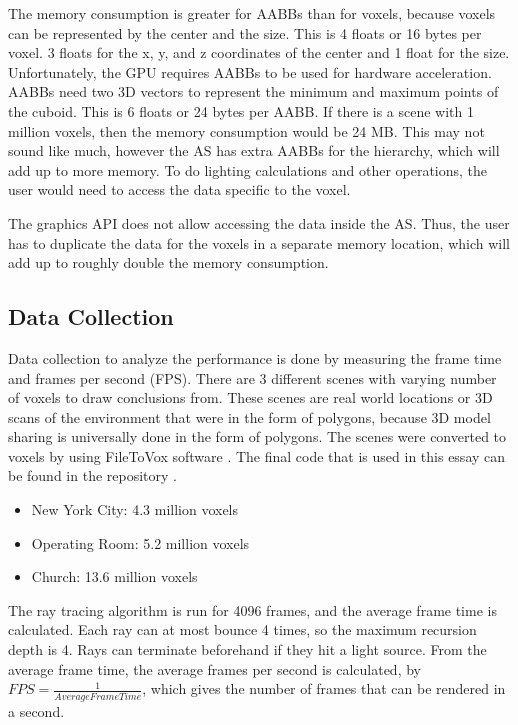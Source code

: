 \documentclass[12pt]{article}
\begin{document}
The memory consumption is greater for AABBs than for voxels, because voxels can be represented by the center and the size.
This is 4 floats or 16 bytes per voxel. 3 floats for the x, y, and z coordinates of the center and 1 float for the size.
Unfortunately, the GPU requires AABBs to be used for hardware acceleration.
AABBs need two 3D vectors to represent the minimum and maximum points of the cuboid.
This is 6 floats or 24 bytes per AABB.
If there is a scene with 1 million voxels, then the memory consumption would be 24 MB.
This may not sound like much, however the AS has extra AABBs for the hierarchy, which will add up to more memory.
To do lighting calculations and other operations, the user would need to access the data specific to the voxel.


The graphics API does not allow accessing the data inside the AS. Thus, the user has to duplicate the data for the voxels in a separate
memory location, which will add up to roughly double the memory consumption.

\subsection{Data Collection}

Data collection to analyze the performance is done by measuring the frame time and frames per second (FPS).
There are 3 different scenes with varying number of voxels to draw conclusions from.
These scenes are real world locations or 3D scans of the environment that were in the form of polygons, because 3D model sharing
is universally done in the form of polygons.
The scenes were converted to voxels by using FileToVox software \parencite{Github:FileToVox}.
The final code that is used in this essay can be found in the repository \parencite{Github:FastVoxels}.

\begin{itemize}
    \itemsep0em
    \item New York City: 4.3 million voxels \parencite{SketchFab:NewYorkCity}
    \item Operating Room: 5.2 million voxels \parencite{SketchFab:OperatingRoom}
    \item Church: 13.6 million voxels \parencite{SketchFab:Church}
\end{itemize}

The ray tracing algorithm is run for 4096 frames, and the average frame time is calculated.
Each ray can at most bounce 4 times, so the maximum recursion depth is 4.
Rays can terminate beforehand if they hit a light source.
From the average frame time, the average frames per second is calculated, by $FPS = \frac{1}{Average Frame Time}$,
which gives the number of frames that can be rendered in a second.
\end{document}
